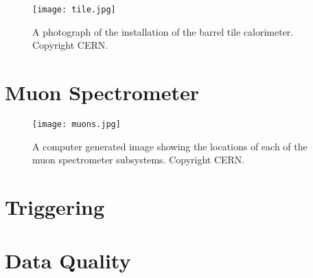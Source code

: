 

\begin{figure}
\centering
\texttt{[image: tile.jpg]}
\label{fig:detector:trt}
\caption{A photograph of the installation of the barrel tile calorimeter. Copyright CERN.}
\end{figure}



\section{Muon Spectrometer}



\begin{figure}
\centering
\texttt{[image: muons.jpg]}
\label{fig:detector:trt}
\caption{A computer generated image showing the locations of each of the muon spectrometer subsystems. Copyright CERN.}
\end{figure}


\section{Triggering}

\section{Data Quality}